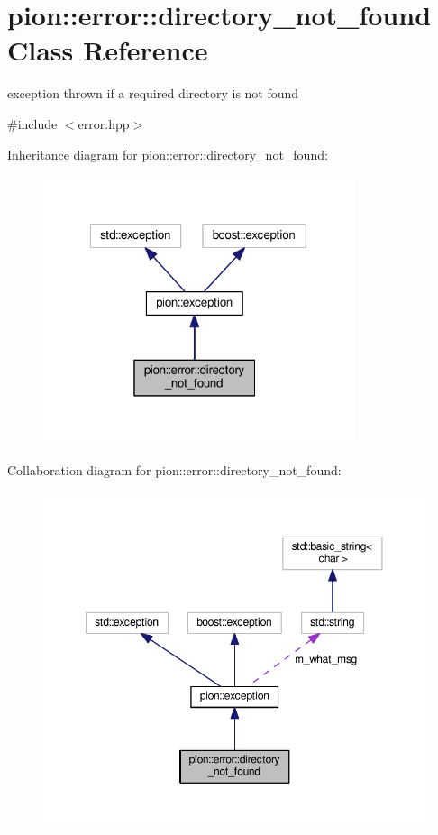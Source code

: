 \hypertarget{classpion_1_1error_1_1directory__not__found}{\section{pion\-:\-:error\-:\-:directory\-\_\-not\-\_\-found Class Reference}
\label{classpion_1_1error_1_1directory__not__found}
}


exception thrown if a required directory is not found  




{\ttfamily \#include $<$error.\-hpp$>$}



Inheritance diagram for pion\-:\-:error\-:\-:directory\-\_\-not\-\_\-found\-:
\nopagebreak
\begin{figure}[H]
\begin{center}
\leavevmode
\includegraphics[width=259pt]{classpion_1_1error_1_1directory__not__found__inherit__graph}
\end{center}
\end{figure}


Collaboration diagram for pion\-:\-:error\-:\-:directory\-\_\-not\-\_\-found\-:
\nopagebreak
\begin{figure}[H]
\begin{center}
\leavevmode
\includegraphics[width=350pt]{classpion_1_1error_1_1directory__not__found__coll__graph}
\end{center}
\end{figure}
